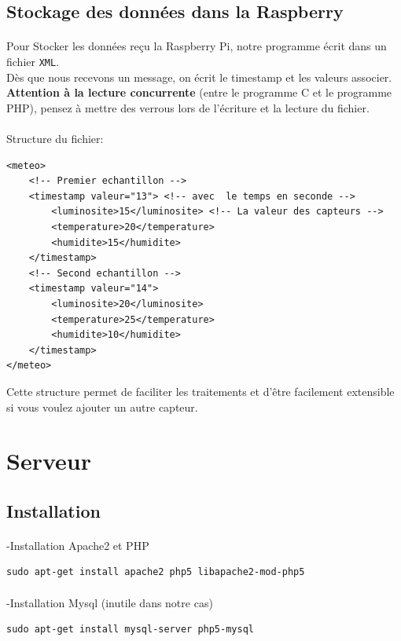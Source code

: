 \documentclass[a4paper, titlepage, oneside, 12pt]{article}%
\begin{document}
\subsection{Stockage des données dans la Raspberry}
\paragraph{}
Pour Stocker les données reçu la Raspberry Pi, notre programme écrit dans un fichier \texttt{XML}.\\
Dès que nous recevons un message, on écrit le timestamp et les valeurs associer.\\
\textbf{Attention à la lecture concurrente }(entre le programme C et le programme PHP), pensez à mettre des verrous lors de l’écriture et la lecture du fichier. \\
\\
Structure du fichier:
\begin{lstlisting}
<meteo>								
	<!-- Premier echantillon -->
	<timestamp valeur="13">	<!-- avec  le temps en seconde -->
		<luminosite>15</luminosite>	<!-- La valeur des capteurs -->
		<temperature>20</temperature>
		<humidite>15</humidite>
	</timestamp>		
	<!-- Second echantillon	-->
	<timestamp valeur="14">					
		<luminosite>20</luminosite>
		<temperature>25</temperature>
		<humidite>10</humidite>
	</timestamp>
</meteo>
\end{lstlisting}

Cette structure permet de faciliter les traitements et d'être facilement extensible si vous voulez ajouter un autre capteur.

\section{Serveur}
\subsection{Installation}
\paragraph{}
-Installation Apache2 et PHP
\begin{lstlisting}
sudo apt-get install apache2 php5 libapache2-mod-php5
\end{lstlisting}
\paragraph{}
-Installation Mysql (inutile dans notre cas)
\begin{lstlisting}
sudo apt-get install mysql-server php5-mysql
\end{lstlisting}
\end{document}
